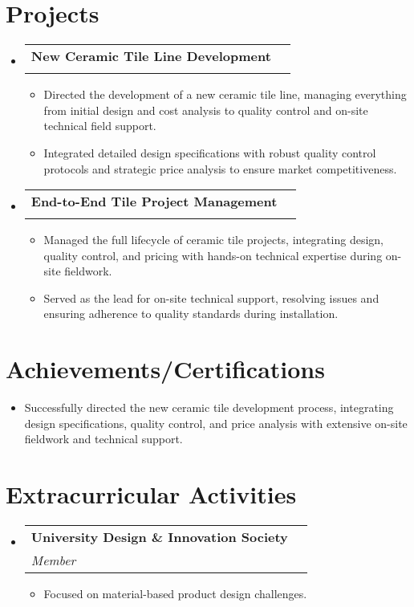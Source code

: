 \documentclass[letterpaper,11pt]{article}
\makeatletter
\newcommand{\resumeItem}[1]{\item\small{#1 \vspace{-2pt}}}
\newcommand{\resumeSubheading}[4]{
  \vspace{-2pt}\item
    \begin{tabular*}{1.0\textwidth}[t]{l@{\extracolsep{\fill}}r}
      \textbf{#1} & \textbf{\small #2} \\
      \textit{\small#3} & \textit{\small #4} \\
    \end{tabular*}\vspace{-7pt}
}
\newcommand{\resumeSubHeadingListStart}{\begin{itemize}[leftmargin=0in, label={}]}
\newcommand{\resumeSubHeadingListEnd}{\end{itemize}}
\newcommand{\resumeItemListStart}{\begin{itemize}}
\newcommand{\resumeItemListEnd}{\end{itemize}\vspace{-5pt}}
\makeatother
\begin{document}
\section{Projects}
\resumeSubHeadingListStart
  \resumeSubheading
    {New Ceramic Tile Line Development}{}{}{}
    \resumeItemListStart
      \resumeItem{Directed the development of a new ceramic tile line, managing everything from initial design and cost analysis to quality control and on-site technical field support.}
      \resumeItem{Integrated detailed design specifications with robust quality control protocols and strategic price analysis to ensure market competitiveness.}
    \resumeItemListEnd
  \resumeSubheading
    {End-to-End Tile Project Management}{}{}{}
    \resumeItemListStart
      \resumeItem{Managed the full lifecycle of ceramic tile projects, integrating design, quality control, and pricing with hands-on technical expertise during on-site fieldwork.}
      \resumeItem{Served as the lead for on-site technical support, resolving issues and ensuring adherence to quality standards during installation.}
    \resumeItemListEnd
\resumeSubHeadingListEnd

\section{Achievements/Certifications}
\begin{itemize}[leftmargin=0.35in, itemsep=0pt, label={\tiny$\bullet$}]
  \item \small Successfully directed the new ceramic tile development process, integrating design specifications, quality control, and price analysis with extensive on-site fieldwork and technical support.
\end{itemize}

\section{Extracurricular Activities}
\resumeSubHeadingListStart
  \resumeSubheading
    {University Design \& Innovation Society}{}{Member}{}
    \resumeItemListStart
      \resumeItem{Focused on material-based product design challenges.}
    \resumeItemListEnd
\resumeSubHeadingListEnd
\end{document}
